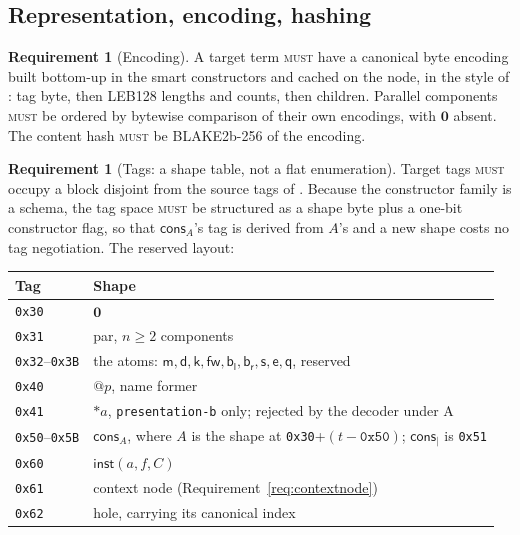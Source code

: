 \documentclass[11pt,a4paper]{article}
\makeatletter
\newcommand{\code}[1]{\texttt{#1}}
\newcommand{\MUST}{\textsc{must}}
\newcommand{\quo}[1]{@#1}
\newcommand{\drp}[1]{{*}#1}
\newcommand{\nil}{\mathbf{0}}
\newcommand{\mm}{\mathsf{m}}
\newcommand{\dd}{\mathsf{d}}
\newcommand{\kk}{\mathsf{k}}
\newcommand{\fw}{\mathsf{fw}}
\newcommand{\bl}{\mathsf{b}_{\mathsf{l}}}
\newcommand{\br}{\mathsf{b}_{\mathsf{r}}}
\newcommand{\sy}{\mathsf{s}}
\newcommand{\ev}{\mathsf{e}}
\newcommand{\qq}{\mathsf{q}}
\newcommand{\cons}{\mathsf{cons}}
\newcommand{\inst}{\mathsf{inst}}
\theoremstyle{definition}
\newtheorem{requirement}[definition]{Requirement}
\theoremstyle{plain}
\makeatother
\begin{document}
\subsection{Representation, encoding, hashing}

\begin{requirement}[Encoding]\label{req:enc}
A target term \MUST{} have a canonical byte encoding built bottom-up in the
smart constructors and cached on the node, in the style of
\cite[\S6]{k1ndl1ng}: tag byte, then LEB128 lengths and counts, then children.
Parallel components \MUST{} be ordered by bytewise comparison of their own
encodings, with $\nil$ absent. The content hash \MUST{} be BLAKE2b-256 of the
encoding.
\end{requirement}

\begin{requirement}[Tags: a shape table, not a flat enumeration]\label{req:tags}
Target tags \MUST{} occupy a block disjoint from the source tags of
\cite[\S6]{k1ndl1ng}. Because the constructor family is a schema, the tag
space \MUST{} be structured as a shape byte plus a one-bit constructor
flag, so that $\cons_{A}$'s tag is derived from $A$'s and a new shape costs no
tag negotiation. The reserved layout:
\end{requirement}

\begin{center}
\begin{tabular}{@{}ll@{}}
\toprule
Tag & Shape\\
\midrule
\code{0x30} & $\nil$\\
\code{0x31} & par, $n \geq 2$ components\\
\code{0x32}--\code{0x3B} & the atoms: $\mm,\dd,\kk,\fw,\bl,\br,\sy,\ev,\qq$,
  reserved\\
\code{0x40} & $\quo{p}$, name former\\
\code{0x41} & $\drp{a}$, \code{presentation-b} only; rejected by the decoder
  under A\\
\code{0x50}--\code{0x5B} & $\cons_{A}$, where $A$ is the shape at
  \code{0x30}+$(t-\code{0x50})$; $\cons_{\mid}$ is \code{0x51}\\
\code{0x60} & $\inst(a,f,C)$\\
\code{0x61} & context node (Requirement~\ref{req:contextnode})\\
\code{0x62} & hole, carrying its canonical index\\
\bottomrule
\end{tabular}
\end{center}
\end{document}
